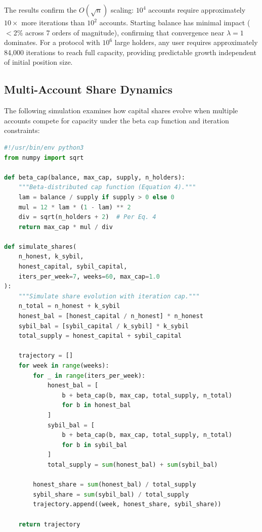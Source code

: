 \documentclass[10pt,a4paper,twocolumn]{article}
\begin{document}
The results confirm the $O(\sqrt{n})$ scaling: $10^4$ accounts require approximately $10\times$ more iterations than $10^2$ accounts. Starting balance has minimal impact ($<$2\% across 7 orders of magnitude), confirming that convergence near $\lambda = 1$ dominates. For a protocol with $10^6$ large holders, any user requires approximately 84,000 iterations to reach full capacity, providing predictable growth independent of initial position size.

\subsection{Multi-Account Share Dynamics}

The following simulation examines how capital shares evolve when multiple accounts compete for capacity under the beta cap function and iteration constraints:

\begin{lstlisting}[language=Python, caption={Multi-account share dynamics simulation}, label=lst:share-sim]
#!/usr/bin/env python3
from numpy import sqrt

def beta_cap(balance, max_cap, supply, n_holders):
    """Beta-distributed cap function (Equation 4)."""
    lam = balance / supply if supply > 0 else 0
    mul = 12 * lam * (1 - lam) ** 2
    div = sqrt(n_holders + 2)  # Per Eq. 4
    return max_cap * mul / div

def simulate_shares(
    n_honest, k_sybil,
    honest_capital, sybil_capital,
    iters_per_week=7, weeks=60, max_cap=1.0
):
    """Simulate share evolution with iteration cap."""
    n_total = n_honest + k_sybil
    honest_bal = [honest_capital / n_honest] * n_honest
    sybil_bal = [sybil_capital / k_sybil] * k_sybil
    total_supply = honest_capital + sybil_capital

    trajectory = []
    for week in range(weeks):
        for _ in range(iters_per_week):
            honest_bal = [
                b + beta_cap(b, max_cap, total_supply, n_total)
                for b in honest_bal
            ]
            sybil_bal = [
                b + beta_cap(b, max_cap, total_supply, n_total)
                for b in sybil_bal
            ]
            total_supply = sum(honest_bal) + sum(sybil_bal)

        honest_share = sum(honest_bal) / total_supply
        sybil_share = sum(sybil_bal) / total_supply
        trajectory.append((week, honest_share, sybil_share))

    return trajectory
\end{lstlisting}
\end{document}
